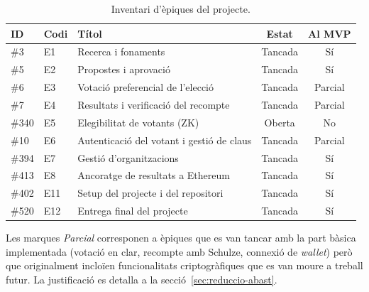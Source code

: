 \begin{table}[ht]
    \centering
    \small
    \begin{tabular}{@{}llp{5cm}cc@{}}
        \toprule
        \textbf{ID} & \textbf{Codi} & \textbf{Títol}                            & \textbf{Estat} & \textbf{Al MVP} \\
        \midrule
        \#3         & E1            & Recerca i fonaments                       & Tancada        & Sí              \\
        \#5         & E2            & Propostes i aprovació                     & Tancada        & Sí              \\
        \#6         & E3            & Votació preferencial de l'elecció         & Tancada        & Parcial         \\
        \#7         & E4            & Resultats i verificació del recompte      & Tancada        & Parcial         \\
        \#340       & E5            & Elegibilitat de votants (\acs{ZK})        & Oberta         & No              \\
        \#10        & E6            & Autenticació del votant i gestió de claus & Tancada        & Parcial         \\
        \#394       & E7            & Gestió d'organitzacions                   & Tancada        & Sí              \\
        \#413       & E8            & Ancoratge de resultats a Ethereum         & Tancada        & Sí              \\
        \#402       & E11           & Setup del projecte i del repositori       & Tancada         & Sí              \\
        \#520       & E12           & Entrega final del projecte                & Tancada        & Sí              \\
        \bottomrule
    \end{tabular}
    \caption[Inventari d'èpiques]{Inventari d'èpiques del projecte.}
    \label{tab:epiques}
\end{table}

Les marques \emph{Parcial} corresponen a èpiques que es van tancar amb la part bàsica implementada (votació en clar,
recompte amb Schulze, connexió de \emph{wallet}) però que originalment incloïen funcionalitats criptogràfiques que es
van moure a treball futur.
La justificació es detalla a la secció~\ref{sec:reduccio-abast}.



